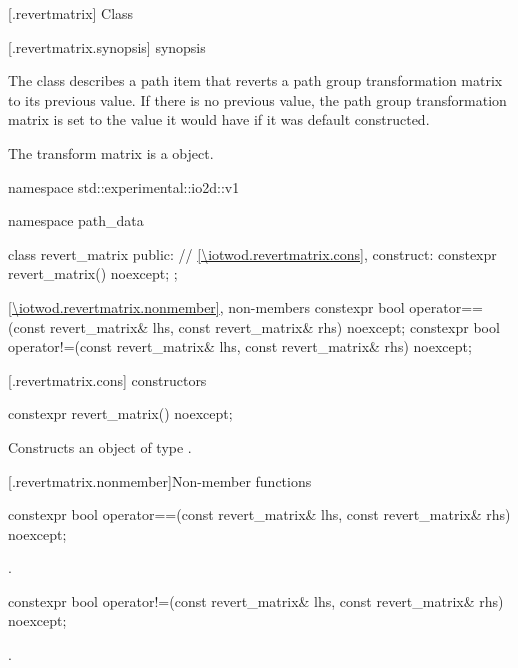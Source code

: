  [\iotwod.revertmatrix] {Class }

 [\iotwod.revertmatrix.synopsis] { synopsis}

\pnum
{}%
The class  describes a path item that reverts a path group transformation matrix to its previous value. If there is no previous value, the path group transformation matrix is set to the value it would have if it was default constructed.

\pnum
The transform matrix is a  object.

\begin{codeblock}
namespace std::experimental::io2d::v1 {
  namespace path_data {
    class revert_matrix {
    public:
      // \ref{\iotwod.revertmatrix.cons}, construct:
      constexpr revert_matrix() noexcept;
    };
    
    \ref{\iotwod.revertmatrix.nonmember}, non-members
    constexpr bool operator==(const revert_matrix& lhs,
      const revert_matrix& rhs) noexcept;
    constexpr bool operator!=(const revert_matrix& lhs,
      const revert_matrix& rhs) noexcept;
  }
}
\end{codeblock}

 [\iotwod.revertmatrix.cons] { constructors}

%
\begin{itemdecl}
constexpr revert_matrix() noexcept;
\end{itemdecl}
\begin{itemdescr}
\pnum
\effects
Constructs an object of type .
\end{itemdescr}

 [\iotwod.revertmatrix.nonmember]{Non-member functions}

%
\begin{itemdecl}
constexpr bool operator==(const revert_matrix& lhs, const revert_matrix& rhs) 
  noexcept;
\end{itemdecl}
\begin{itemdescr}
\pnum
\returns
{}.
\end{itemdescr}

%
\begin{itemdecl}
constexpr bool operator!=(const revert_matrix& lhs, const revert_matrix& rhs) 
  noexcept;
\end{itemdecl}
\begin{itemdescr}
\pnum
\returns
{}.
\end{itemdescr}
